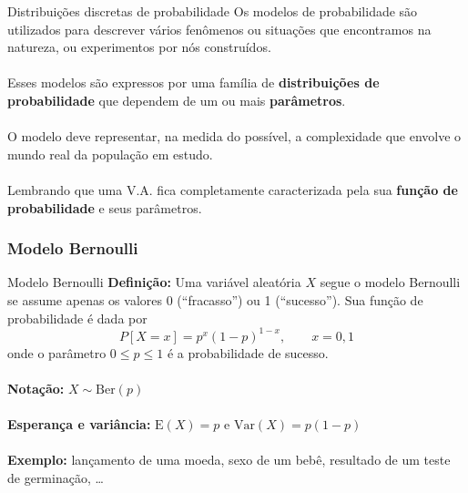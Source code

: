 \documentclass[10pt]{beamer}\usepackage[]{graphicx}\usepackage[]{color}
\providecommand{\E}{\text{E}}
\providecommand{\Var}{\text{Var}}
\theoremstyle{definition}
\begin{document}
\begin{frame}[fragile]{Distribuições discretas de probabilidade}
  Os modelos de probabilidade são utilizados para descrever vários
  fenômenos ou situações que encontramos na natureza, ou experimentos
  por nós construídos. \\~\\
  Esses modelos são expressos por uma família de \textbf{distribuições
    de probabilidade} que dependem de um ou mais \textbf{parâmetros}. \\~\\
  O modelo deve representar, na medida do possível, a complexidade que
  envolve o mundo real da população em estudo. \\~\\
  Lembrando que uma V.A. fica completamente caracterizada pela sua
  \textbf{função de probabilidade} e seus parâmetros.
\end{frame}

\subsubsection{Modelo Bernoulli}

\begin{frame}[fragile]{Modelo Bernoulli}
\textbf{Definição:} Uma variável aleatória $X$ segue o modelo Bernoulli
se assume apenas os valores 0 (``fracasso'') ou 1 (``sucesso''). Sua
função de probabilidade é dada por
\begin{equation*}
  P[X = x] = p^x (1-p)^{1-x}, \quad \quad x = 0, 1
\end{equation*}
onde o parâmetro $0 \leq p \leq 1$ é a probabilidade de sucesso. \\~\\
\textbf{Notação:} $X \sim \text{Ber}(p)$  \\~\\
\textbf{Esperança e variância:} $\E(X) = p$ e $\Var(X) = p(1-p)$ \\~\\
\textbf{Exemplo:} lançamento de uma moeda, sexo de um bebê, resultado de
um teste de germinação, \ldots
\end{frame}
\end{document}
